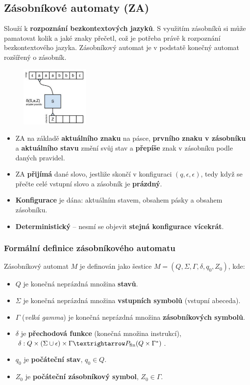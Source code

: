 \subsection{Zásobníkové automaty (ZA)}
Slouží k \textbf{rozpoznání bezkontextových jazyků}. S využitím zásobníků si může pamatovat kolik a jaké znaky přečetl, což je potřeba právě k rozpoznání bezkontextového jazyka. Zásobníkový automat je v podstatě konečný automat rozšířený o zásobník. 

\begin{figure}[H]
	\centering
	\includegraphics[width=0.30\textwidth]{assets/za}
\end{figure}

\begin{itemize}
\item ZA na základě \textbf{aktuálního znaku} na pásce, \textbf{prvního znaku v zásobníku} a \textbf{aktuálního stavu} změní svůj stav a \textbf{přepíše} znak v zásobníku podle daných pravidel.
\item ZA \textbf{přijímá} dané slovo, jestliže skončí v konfiguraci $(q, \epsilon, \epsilon)$, tedy když se přečte celé vstupní slovo a zásobník je \textbf{prázdný}.
\item \textbf{Konfigurace} je dána: aktuálním stavem, obsahem pásky a obsahem zásobníku.
\item \textbf{Deterministický} -- nesmí se objevit \textbf{stejná konfigurace vícekrát}.
\end{itemize}

\subsubsection{Formální definice zásobníkového automatu}
Zásobníkový automat $M$ je definován jako šestice $M = (Q, \Sigma, \Gamma, \delta, q_0, Z_0)$, kde:
\begin{itemize}
\item $Q$ je konečná neprázdná množina \textbf{stavů}.
\item $\Sigma$ je konečná neprázdná množina \textbf{vstupních symbolů} (vstupní abeceda).
\item $\Gamma$ (\textit{velká gamma}) je konečná neprázdná množina \textbf{zásobníkových symbolů}.
\item $\delta$ je \textbf{přechodová funkce} (konečná množina instrukcí), $\delta: Q \times (\Sigma \cup {\epsilon}) \times \Gamma → P_{\rm fin}(Q \times \Gamma^*)$.
\item $q_0$ je \textbf{počáteční stav}, $q_0 \in Q$.
\item $Z_0$ je \textbf{počáteční zásobníkový symbol}, $Z_0 \in \Gamma$.
\end{itemize}

